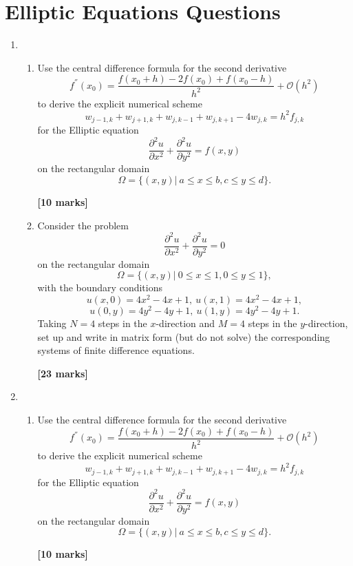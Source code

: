 \chapter{Elliptic Equations Questions}
\begin{enumerate}
\item
	\begin{enumerate}
	
\item 
Use the central difference formula for the second derivative 
\[ f^{''}(x_0)=\frac{f(x_0+h)-2f(x_0)+f(x_0-h)}{h^2}+\mathcal{O}(h^2)\]
to derive the explicit numerical scheme
\[w_{j-1,k}+w_{j+1,k}+w_{j,k-1}+w_{j,k+1}-4w_{j,k}=h^2f_{j,k}\]
for the Elliptic equation 
\[\frac{\partial^2 u}{\partial x^2}+\frac{\partial^2 u}{\partial y^2}=f(x,y) \]
on the rectangular domain
\[\Omega=\{(x,y)| \ a\leq x \leq b, c \leq y \leq d\}. \]
\begin{flushright}
\textbf{[10 marks]}
\end{flushright}
	
\item Consider the problem
\[\frac{\partial^2 u}{\partial x^2}+\frac{\partial^2 u}{\partial y^2}=0 \]
on the rectangular domain
\[\Omega=\{(x,y)| \ 0\leq x \leq 1, 0 \leq y \leq 1\}, \]
with the boundary conditions
\[ u(x,0)=4x^2-4x+1, \ u(x,1)=4x^2-4x+1, \] \[ u(0,y)=4y^2-4y+1, \ u(1,y)=4y^2-4y+1.   \]
Taking $N=4$ steps in the $x$-direction and $M=4$ steps in the $y$-direction, set up and write in matrix form (but do not solve) the corresponding systems of finite difference equations.
\begin{flushright}
\textbf{[23 marks]}
\end{flushright}
		
\end{enumerate}
\newpage
\item
	\begin{enumerate}
	
\item 
Use the central difference formula for the second derivative 
\[ f^{''}(x_0)=\frac{f(x_0+h)-2f(x_0)+f(x_0-h)}{h^2}+\mathcal{O}(h^2)\]
to derive the explicit numerical scheme
\[w_{j-1,k}+w_{j+1,k}+w_{j,k-1}+w_{j,k+1}-4w_{j,k}=h^2f_{j,k}\]
for the Elliptic equation 
\[\frac{\partial^2 u}{\partial x^2}+\frac{\partial^2 u}{\partial y^2}=f(x,y) \]
on the rectangular domain
\[\Omega=\{(x,y)| \ a\leq x \leq b, c \leq y \leq d\}. \]
\begin{flushright}
\textbf{[10 marks]}
\end{flushright}
	

\end{enumerate}
\end{enumerate}
